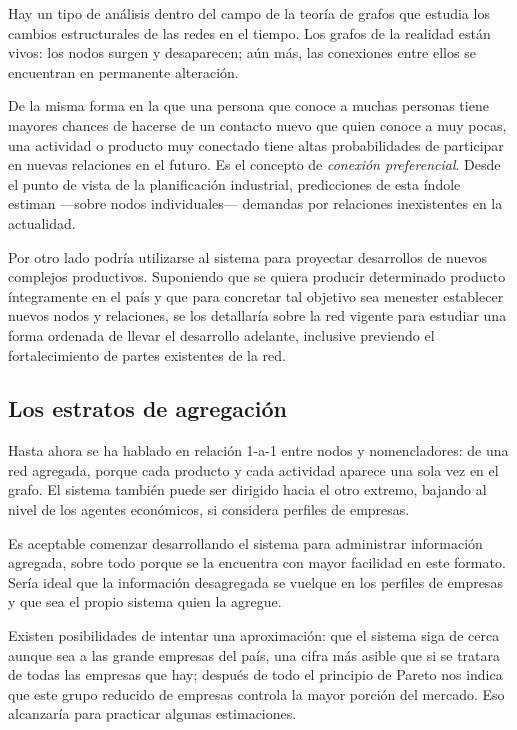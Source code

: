 \documentclass[a4paper]{report}
\begin{document}
Hay un tipo de análisis dentro del campo de la teoría de grafos que estudia los cambios estructurales de las redes en el tiempo. Los grafos de la realidad están vivos: los nodos surgen y desaparecen; aún más, las conexiones entre ellos se encuentran en permanente alteración.

De la misma forma en la que una persona que conoce a muchas personas tiene mayores chances de hacerse de un contacto nuevo que quien conoce a muy pocas, una actividad o producto muy conectado tiene altas probabilidades de participar en nuevas relaciones en el futuro. Es el concepto de \textit{conexión preferencial}. Desde el punto de vista de la planificación industrial, predicciones de esta índole estiman —sobre nodos individuales— demandas por relaciones inexistentes en la actualidad.

Por otro lado podría utilizarse al sistema para proyectar desarrollos de nuevos complejos productivos. Suponiendo que se quiera producir determinado producto íntegramente en el país y que para concretar tal objetivo sea menester establecer nuevos nodos y relaciones, se los detallaría sobre la red vigente para estudiar una forma ordenada de llevar el desarrollo adelante, inclusive previendo el fortalecimiento de partes existentes de la red.

\subsection*{Los estratos de agregación}

Hasta ahora se ha hablado en relación 1-a-1 entre nodos y nomencladores: de una red agregada, porque cada producto y cada actividad aparece una sola vez en el grafo. El sistema también puede ser dirigido hacia el otro extremo, bajando al nivel de los agentes económicos, si considera perfiles de empresas.

Es aceptable comenzar desarrollando el sistema para administrar información agregada, sobre todo porque se la encuentra con mayor facilidad en este formato. Sería ideal que la información desagregada se vuelque en los perfiles de empresas y que sea el propio sistema quien la agregue.

Existen posibilidades de intentar una aproximación: que el sistema siga de cerca aunque sea a las grande empresas del país, una cifra más asible que si se tratara de todas las empresas que hay; después de todo el principio de Pareto nos indica que este grupo reducido de empresas controla la mayor porción del mercado. Eso alcanzaría para practicar algunas estimaciones.
\end{document}
